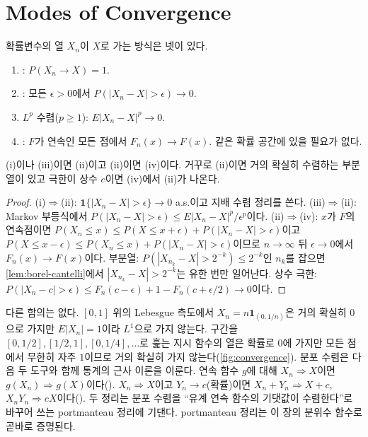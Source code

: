 \section{Modes of Convergence}
\label{sec:convergence}

확률변수의 열 $X_n$이 $X$로 가는 방식은 넷이 있다.
\begin{enumerate}
\item {}: $P(X_n\to X)=1$.
\item {}: 모든 $\epsilon>0$에서 $P(|X_n-X|>\epsilon)\to0$.
\item $L^p$ 수렴($p\ge1$): $E|X_n-X|^p\to0$.
\item {}: $F$가 연속인 모든 점에서 $F_n(x)\to F(x)$. 같은 확률 공간에 있을 필요가 없다.
\end{enumerate}

\begin{proposition}
\label{prop:convergence-implications}
(i)이나 (iii)이면 (ii)이고 (ii)이면 (iv)이다. 거꾸로 (ii)이면 거의 확실히 수렴하는 부분열이 있고 극한이 상수 $c$이면 (iv)에서 (ii)가 나온다.
\end{proposition}

\begin{proof}
(i)$\Rightarrow$(ii): $\mathbf 1\{|X_n-X|>\epsilon\}\to0$ a.s.이고 지배 수렴 정리를 쓴다. (iii)$\Rightarrow$(ii): Markov 부등식에서 $P(|X_n-X|>\epsilon)\le E|X_n-X|^p/\epsilon^p$이다. (ii)$\Rightarrow$(iv): $x$가 $F$의 연속점이면 $P(X_n\le x)\le P(X\le x+\epsilon)+P(|X_n-X|>\epsilon)$이고 $P(X\le x-\epsilon)\le P(X_n\le x)+P(|X_n-X|>\epsilon)$이므로 $n\to\infty$ 뒤 $\epsilon\to0$에서 $F_n(x)\to F(x)$이다. 부분열: $P(|X_{n_k}-X|>2^{-k})\le2^{-k}$인 $n_k$를 잡으면 \cref{lem:borel-cantelli}에서 $|X_{n_k}-X|>2^{-k}$는 유한 번만 일어난다. 상수 극한: $P(|X_n-c|>\epsilon)\le F_n(c-\epsilon)+1-F_n(c+\epsilon/2)\to0$이다.
\end{proof}

다른 함의는 없다. $[0,1]$ 위의 Lebesgue 측도에서 $X_n=n\mathbf 1_{(0,1/n)}$은 거의 확실히 $0$으로 가지만 $E|X_n|=1$이라 $L^1$으로 가지 않는다. 구간을 $[0,1/2],[1/2,1],[0,1/4],\dots$로 훑는 지시 함수의 열은 확률로 $0$에 가지만 모든 점에서 무한히 자주 $1$이므로 거의 확실히 가지 않는다(\cref{fig:convergence}). 분포 수렴은 다음 두 도구와 함께 통계의 근사 이론을 이룬다. 연속 함수 $g$에 대해 $X_n\Rightarrow X$이면 $g(X_n)\Rightarrow g(X)$이다(). $X_n\Rightarrow X$이고 $Y_n\to c$(확률)이면 $X_n+Y_n\Rightarrow X+c$, $X_nY_n\Rightarrow cX$이다(). 두 정리는 분포 수렴을 ``유계 연속 함수의 기댓값이 수렴한다''로 바꾸어 쓰는 portmanteau 정리에 기댄다. portmanteau 정리는 이 장의 분위수 함수로 곧바로 증명된다.

